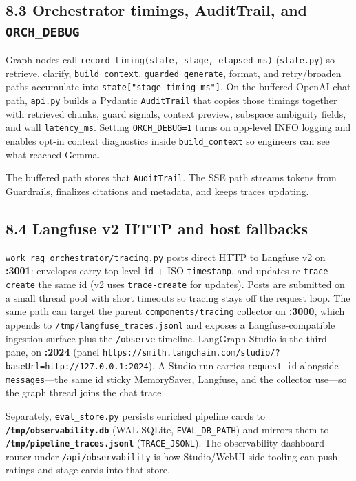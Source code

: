 \subsection{\texorpdfstring{8.3 Orchestrator timings, AuditTrail, and \texttt{ORCH\_DEBUG}}{8.3 Orchestrator timings, AuditTrail, and ORCH\_DEBUG}}\label{orchestrator-timings-audittrail-and-orch_debug}

Graph nodes call \texttt{record\_timing(state,\ stage,\ elapsed\_ms)} (\texttt{state.py}) so retrieve, clarify, \texttt{build\_context}, \texttt{guarded\_generate}, format, and retry/broaden paths accumulate into \texttt{state{[}"stage\_timing\_ms"{]}}. On the buffered OpenAI chat path, \texttt{api.py} builds a Pydantic \texttt{AuditTrail} that copies those timings together with retrieved chunks, guard signals, context preview, subspace ambiguity fields, and wall \texttt{latency\_ms}. Setting \texttt{ORCH\_DEBUG=1} turns on app-level INFO logging and enables opt-in context diagnostics inside \texttt{build\_context} so engineers can see what reached Gemma.

The buffered path stores that \texttt{AuditTrail}. The SSE path streams tokens from Guardrails, finalizes citations and metadata, and keeps traces updating.

\subsection{8.4 Langfuse v2 HTTP and host fallbacks}\label{langfuse-v2-http-and-host-fallbacks}

\texttt{work\_rag\_orchestrator/tracing.py} posts direct HTTP to Langfuse v2 on \textbf{:3001}: envelopes carry top-level \texttt{id} + ISO \texttt{timestamp}, and updates re-\texttt{trace-create} the same id (v2 uses \texttt{trace-create} for updates). Posts are submitted on a small thread pool with short timeouts so tracing stays off the request loop. The same path can target the parent \texttt{components/tracing} collector on \textbf{:3000}, which appends to \texttt{/tmp/langfuse\_traces.jsonl} and exposes a Langfuse-compatible ingestion surface plus the \texttt{/observe} timeline. LangGraph Studio is the third pane, on \textbf{:2024} (panel \texttt{https://smith.langchain.com/studio/?baseUrl=http://127.0.0.1:2024}). A Studio run carries \texttt{request\_id} alongside \texttt{messages}---the same id sticky MemorySaver, Langfuse, and the collector use---so the graph thread joins the chat trace.

Separately, \texttt{eval\_store.py} persists enriched pipeline cards to \textbf{\texttt{/tmp/observability.db}} (WAL SQLite, \texttt{EVAL\_DB\_PATH}) and mirrors them to \textbf{\texttt{/tmp/pipeline\_traces.jsonl}} (\texttt{TRACE\_JSONL}). The observability dashboard router under \texttt{/api/observability} is how Studio/WebUI-side tooling can push ratings and stage cards into that store.

